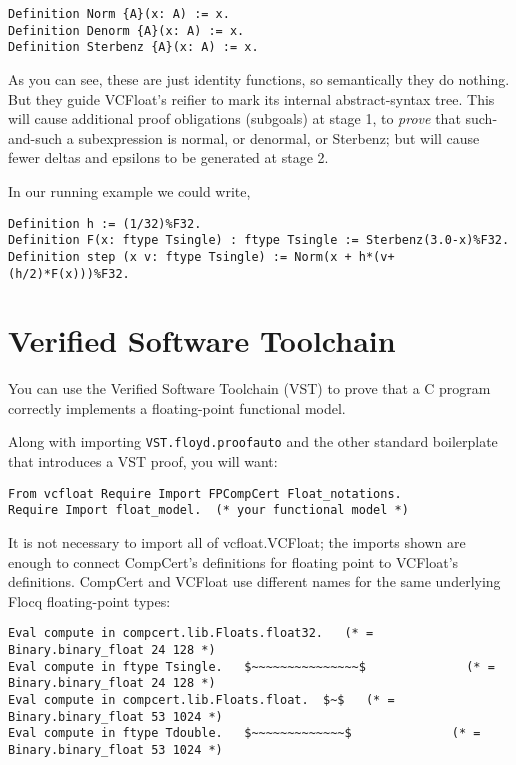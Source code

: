 \documentclass[article]{memoir}
\begin{document}
\begin{lstlisting}
Definition Norm {A}(x: A) := x.
Definition Denorm {A}(x: A) := x.
Definition Sterbenz {A}(x: A) := x.
\end{lstlisting}

As you can see, these are just identity functions, so semantically they
do nothing.  But they guide VCFloat's reifier to mark its internal
abstract-syntax tree.  This will cause additional proof obligations
(subgoals) at stage 1, to \emph{prove} that such-and-such a subexpression
is normal, or denormal, or Sterbenz; but will cause fewer
deltas and epsilons to be generated at stage 2.

In our running example we could write,
\begin{lstlisting}
Definition h := (1/32)%F32.
Definition F(x: ftype Tsingle) : ftype Tsingle := Sterbenz(3.0-x)%F32.  
Definition step (x v: ftype Tsingle) := Norm(x + h*(v+(h/2)*F(x)))%F32.
\end{lstlisting}

\chapter{Verified Software Toolchain}

You can use the Verified Software Toolchain (VST) to prove that a C program
correctly implements a floating-point functional model.

Along with importing \lstinline{VST.floyd.proofauto} and
the other standard boilerplate that introduces a VST proof,
you will want:

\begin{lstlisting}
From vcfloat Require Import FPCompCert Float_notations.
Require Import float_model.  (* your functional model *)
\end{lstlisting}

It is not necessary to import all of vcfloat.VCFloat; the imports shown
are enough to connect CompCert's definitions for floating point
to VCFloat's definitions.  CompCert and VCFloat use different names
for the same underlying Flocq floating-point types:

\begin{lstlisting}
Eval compute in compcert.lib.Floats.float32.   (* = Binary.binary_float 24 128 *)
Eval compute in ftype Tsingle.   $~~~~~~~~~~~~~~~$              (* = Binary.binary_float 24 128 *)
Eval compute in compcert.lib.Floats.float.  $~$   (* = Binary.binary_float 53 1024 *)
Eval compute in ftype Tdouble.   $~~~~~~~~~~~~~$              (* = Binary.binary_float 53 1024 *)
\end{lstlisting}
\end{document}
